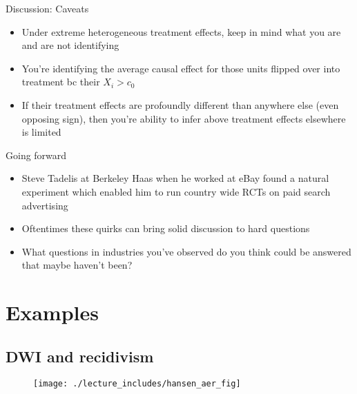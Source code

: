 \documentclass{beamer}
\begin{document}
\begin{frame}{Discussion: Caveats}

\begin{itemize}
\item Under extreme heterogeneous treatment effects, keep in mind what you are and are not identifying
\item You're identifying the average causal effect for those units flipped over into treatment bc their $X_i>c_0$
\item If their treatment effects are profoundly different than anywhere else (even opposing sign), then you're ability to infer above treatment effects elsewhere is limited
\end{itemize}

\end{frame}

\begin{frame}{Going forward}

\begin{itemize}
\item Steve Tadelis at Berkeley Haas when he worked at eBay found a natural experiment which enabled him to run country wide RCTs on paid search advertising
\item Oftentimes these quirks can bring solid discussion to hard questions
\item What questions in industries you've observed do you think could be answered that maybe haven't been?
\end{itemize}

\end{frame}

\section{Examples}

\subsection{DWI and recidivism}

\begin{frame}

	\begin{figure}
	\texttt{[image: ./lecture\_includes/hansen\_aer\_fig]}
	\end{figure}
\end{frame}
\end{document}

